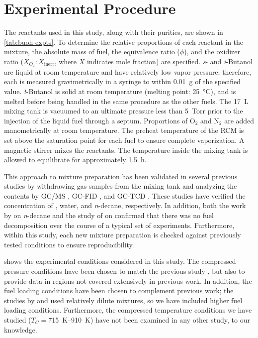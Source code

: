 \documentclass[12pt, letterpaper]{article}
\begin{document}
\section{Experimental Procedure}
\label{sec:buoh-proc}

The reactants used in this study, along with their purities, are shown in
\autoref{tab:buoh-expts}. To determine the relative proportions of each
reactant in the mixture, the absolute mass of fuel, the equivalence ratio
($\phi$), and the oxidizer ratio ($X_{O_2}:X_{\mathrm{inert}}$, where $X$
indicates mole fraction) are specified. \textit{s}- and \textit{i}-Butanol are
liquid at room temperature and have relatively low vapor pressure; therefore,
each is measured gravimetrically in a syringe to within \SI{0.01}{g} of the specified
value. \textit{t}-Butanol is solid at room temperature (melting point: \SI{25}{\celsius}),
and is melted before being handled in the same procedure as the other fuels.
The \SI{17}{\liter} mixing tank is vacuumed to an ultimate pressure less than \SI{5}{Torr} prior
to the injection of the liquid fuel through a septum. Proportions of O$_2$ and
N$_2$ are added manometrically at room temperature. The preheat temperature of
the RCM is set above the saturation point for each fuel to ensure complete
vaporization. A magnetic stirrer mixes the reactants. The temperature inside
the mixing tank is allowed to equilibrate for approximately \SI{1.5}{\hour}.

This approach to mixture preparation has been validated in several previous
studies by withdrawing gas samples from the mixing tank and analyzing the
contents by GC/MS \cite{Weber2011}, GC-FID \cite{Kumar2009}, and GC-TCD
\cite{Das2012}. These studies have verified the concentration of
\nBuOH{}, water, and \textit{n}-decane, respectively. In addition,
both the work by \textcite{Kumar2009} on \textit{n}-decane and the study of
\textcite{Weber2011} on \nBuOH{} confirmed that there was no fuel
decomposition over the course of a typical set of experiments. Furthermore,
within this study, each new mixture preparation is checked against previously
tested conditions to ensure reproducibility.

 shows the experimental conditions considered in this
study. The compressed pressure conditions have been chosen to match the
previous \nBuOH{} study \cite{Weber2011}, but also to provide data in
regions not covered extensively in previous work. In addition, the fuel loading
conditions have been chosen to complement previous work; the studies by
\textcite{Stranic2012} and \textcite{Moss2008} used relatively dilute mixtures,
so we have included higher fuel loading conditions. Furthermore, the compressed
temperature conditions we have studied ($T_C=$\SIrange{715}{910}{\kelvin}) have not been examined
in any other study, to our knowledge.
\end{document}
